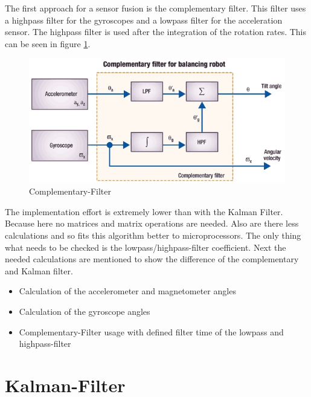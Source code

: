 The first approach for a sensor fusion is the complementary filter. This filter uses a highpass filter for the gyroscopes and a lowpass filter for the acceleration sensor. The highpass filter is used after the integration of the rotation rates. This can be seen in figure \ref{fig:complementary}.\\
\begin{figure}[H]
	\centering\includegraphics[width=1\textwidth]{fig/Kal_Comp/Complementary.jpg}
	\caption{Complementary-Filter\cite{doc:STM}}
	\label{fig:complementary}
\end{figure}
The implementation effort is extremely lower than with the Kalman Filter. Because here no matrices and matrix operations are needed. Also are there less calculations and so fits this algorithm better to microprocessors. The only thing what needs to be checked is the lowpass/highpass-filter coefficient. Next the needed calculations are mentioned to show the difference of the complementary and Kalman filter.
\begin{itemize}
	\item Calculation of the accelerometer and magnetometer angles
	\item Calculation of the gyroscope angles
	\item Complementary-Filter usage with defined filter time of the lowpass and highpass-filter
\end{itemize}


\newpage
\section{Kalman-Filter}
\label{sec:KalmanFilter}

